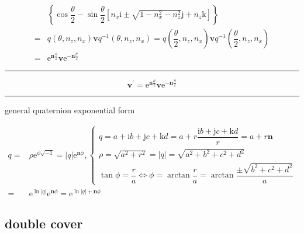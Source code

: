 \documentclass[
]{book}
\theoremstyle{definition}
\theoremstyle{definition}
\theoremstyle{definition}
\theoremstyle{definition}
\theoremstyle{remark}
\begin{document}
\[\begin{aligned}
 & \left\{ \cos\dfrac{\theta}{2}-\sin\dfrac{\theta}{2}\left[n_{{\scriptscriptstyle x}}\mathrm{i}\pm\sqrt{1-n_{{\scriptscriptstyle x}}^{2}-n_{{\scriptscriptstyle z}}^{2}}\mathrm{j}+n_{{\scriptscriptstyle z}}\mathrm{k}\right]\right\} \\
= & q\left(\theta,n_{{\scriptscriptstyle z}},n_{{\scriptscriptstyle x}}\right)\boldsymbol{v}q^{-1}\left(\theta,n_{{\scriptscriptstyle z}},n_{{\scriptscriptstyle x}}\right)=q\left(\dfrac{\theta}{2},n_{{\scriptscriptstyle z}},n_{{\scriptscriptstyle x}}\right)\boldsymbol{v}q^{-1}\left(\dfrac{\theta}{2},n_{{\scriptscriptstyle z}},n_{{\scriptscriptstyle x}}\right)\\
= & \mathrm{e}^{\boldsymbol{n}\frac{\theta}{2}}\boldsymbol{v}\mathrm{e}^{-\boldsymbol{n}\frac{\theta}{2}}
\end{aligned}
\]

\begin{center}\rule{0.5\linewidth}{0.5pt}\end{center}

\[
\boldsymbol{v}^{\prime}=\mathrm{e}^{\boldsymbol{n}\frac{\theta}{2}}\boldsymbol{v}\mathrm{e}^{-\boldsymbol{n}\frac{\theta}{2}}
\]

\begin{center}\rule{0.5\linewidth}{0.5pt}\end{center}

general quaternion exponential form

\[
\begin{aligned}
q= & \rho\mathrm{e}^{\phi\sqrt{-1}}=\left|q\right|\mathrm{e}^{\boldsymbol{n}\phi},\begin{cases}
q=a+\mathrm{i}b+\mathrm{j}c+\mathrm{k}d=a+r\dfrac{\mathrm{i}b+\mathrm{j}c+\mathrm{k}d}{r}=a+r\boldsymbol{n}\\
\rho=\sqrt{a^{2}+r^{2}}=\left|q\right|=\sqrt{a^{2}+b^{2}+c^{2}+d^{2}}\\
\tan\phi=\dfrac{r}{a}\Leftrightarrow\phi=\arctan\dfrac{r}{a}=\arctan\dfrac{\pm\sqrt{b^{2}+c^{2}+d^{2}}}{a}
\end{cases}\\
= & \mathrm{e}^{\ln\left|q\right|}\mathrm{e}^{\boldsymbol{n}\phi}=\mathrm{e}^{\ln\left|q\right|+\boldsymbol{n}\phi}
\end{aligned}
\]

\hypertarget{double-cover}{%
\subsection{double cover}\label{double-cover}}
\end{document}

